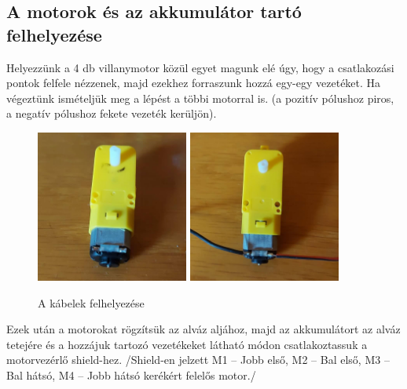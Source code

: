 \documentclass[]{thesis-ekf}
\theoremstyle{definition}
\begin{document}
\subsection{A motorok és az akkumulátor tartó felhelyezése}
Helyezzünk a 4 db villanymotor közül egyet magunk elé úgy, hogy a csatlakozási pontok felfele nézzenek, majd ezekhez forraszunk hozzá egy-egy vezetéket. Ha végeztünk ismételjük meg a lépést a többi motorral is. (a pozitív pólushoz piros, a negatív pólushoz fekete vezeték kerüljön).
\begin{figure}[h]
	\centering
	\includegraphics[width=5cm]{images/robot_build/motor-no-cable}
	\includegraphics[width=5cm]{images/robot_build/motor-with-cable}
	\caption{A kábelek felhelyezése}
	\label{motor-handling}
\end{figure}

Ezek után a motorokat rögzítsük az alváz aljához, majd az akkumulátort az alváz tetejére és a hozzájuk tartozó vezetékeket  látható módon csatlakoztassuk a motorvezérlő shield-hez. /Shield-en jelzett M1 – Jobb első, M2 – Bal első, M3 – Bal hátsó, M4 – Jobb hátsó kerékért felelős motor./
\end{document}
